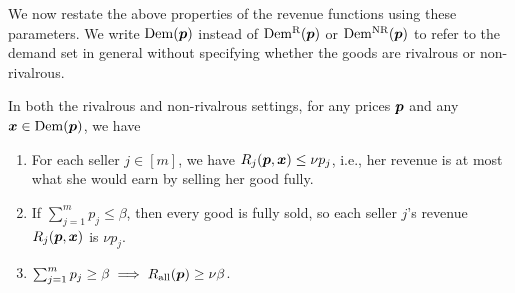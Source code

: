 We now restate the above properties of the revenue functions using these parameters.
We write $\operatorname{Dem}(\bm{p})$ instead of $\operatorname{Dem^{\mathrm{R}}}(\bm{p})$ or $\operatorname{Dem^{\mathrm{NR}}}(\bm{p})$ to refer to the demand set
in general without specifying whether the goods are rivalrous or non-rivalrous.

\begin{observation}
\label{thm:accounting}
In both the rivalrous and non-rivalrous settings,
for any prices $\bm{p}$ and any $\bm{x} \in \operatorname{Dem}(\bm{p})$, we have
\begin{enumerate}
\item \label{item:rev-props:ub}For each seller $j \in [m]$,
    we have $R_j(\bm{p}, \bm{x}) \le \nu p_j$, i.e., her revenue is
    at most what she would earn by selling her good fully.
\item \label{item:rev-props:low-prices}If $\sum_{j=1}^m p_j \le \beta$, then every good
    is fully sold, so each seller $j$'s revenue $R_j(\bm{p}, \bm{x})$ is $\nu p_j$.
\item \label{item:rev-props:high-prices}$\sum_{j=1}^m p_j \ge \beta \implies R_{\operatorname{all}}(\bm{p}) \ge \nu \beta$.
\end{enumerate}
\end{observation}
